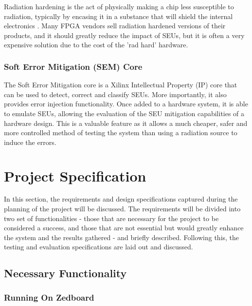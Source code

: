 \documentclass[12pt]{article}
\begin{document}
Radiation hardening is the act of physically making a chip less susceptible to radiation, typically by encasing it in a substance that will shield the internal electronics \cite{RadHardFpga}. Many FPGA vendors sell radiation hardened versions of their products, and it should greatly reduce the impact of SEUs, but it is often a very expensive solution due to the cost of the 'rad hard' hardware.

\subsubsection{Soft Error Mitigation (SEM) Core}
\label{sec:Background-FPGAsAndSpaceApplications-SEM}

The Soft Error Mitigation core is a Xilinx Intellectual Property (IP) core that can be used to detect, correct and classify SEUs. More importantly, it also provides error injection functionality\cite{SEM}. Once added to a hardware system, it is able to emulate SEUs, allowing the evaluation of the SEU mitigation capabilities of a hardware design. This is a valuable feature as it allows a much cheaper, safer and more controlled method of testing the system than using a radiation source to induce the errors. 

\newpage

\section{Project Specification}
\label{sec:ProjSpec}

In this section, the requirements and design specifications captured during the planning of the project will be discussed. The requirements will be divided into two set of functionalities - those that are necessary for the project to be considered a success, and those that are not essential but would greatly enhance the system and the results gathered - and briefly described. Following this, the testing and evaluation specifications are laid out and discussed.

\subsection{Necessary Functionality}
\label{sec:ProjSpec-Necessary}

\subsubsection{Running On Zedboard}
\label{sec:ProjSpec-Necessary-Zedboard}
\end{document}
